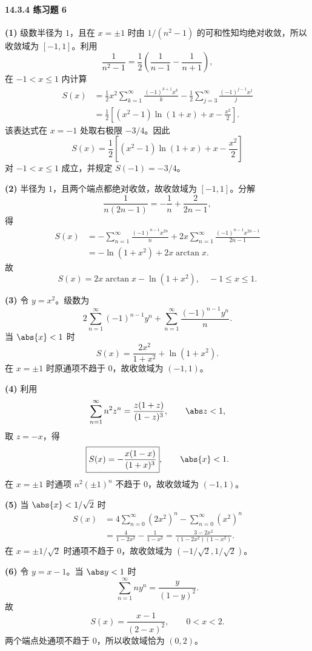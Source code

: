 \paragraph{14.3.4 练习题 6}
\begin{xsolution}
\textbf{(1)} 级数半径为 $1$，且在 $x=\pm1$ 时由 $1/(n^2-1)$ 的可和性知均绝对收敛，所以收敛域为 $[-1,1]$。利用
\[
  \frac1{n^2-1}=\frac12\left(\frac1{n-1}-\frac1{n+1}\right),
\]
在 $-1<x\leqslant1$ 内计算
\[
\begin{aligned}
  S(x)
  &=\frac12x^2\sum_{k=1}^{\infty}\frac{(-1)^{k+1}x^k}{k}
   -\frac12\sum_{j=3}^{\infty}\frac{(-1)^{j-1}x^j}{j}\\
  &=\frac12\left[(x^2-1)\ln(1+x)+x-\frac{x^2}{2}\right].
\end{aligned}
\]
该表达式在 $x=-1$ 处取右极限 $-3/4$。因此
\[
  \boxed{S(x)=\frac12\left[(x^2-1)\ln(1+x)+x-\frac{x^2}{2}\right]}
\]
对 $-1<x\leqslant1$ 成立，并规定 $S(-1)=-3/4$。

\textbf{(2)} 半径为 $1$，且两个端点都绝对收敛，故收敛域为 $[-1,1]$。分解
\[
  \frac1{n(2n-1)}=-\frac1n+\frac2{2n-1},
\]
得
\[
\begin{aligned}
  S(x)
  &=-\sum_{n=1}^{\infty}\frac{(-1)^{n-1}x^{2n}}n
  +2x\sum_{n=1}^{\infty}\frac{(-1)^{n-1}x^{2n-1}}{2n-1}\\
  &=-\ln(1+x^2)+2x\arctan x.
\end{aligned}
\]
故
\[
  \boxed{S(x)=2x\arctan x-\ln(1+x^2),\quad -1\leqslant x\leqslant1}.
\]

\textbf{(3)} 令 $y=x^2$。级数为
\[
  2\sum_{n=1}^{\infty}(-1)^{n-1}y^n
  +\sum_{n=1}^{\infty}\frac{(-1)^{n-1}y^n}{n}.
\]
当 $\abs{x}<1$ 时
\[
  \boxed{S(x)=\frac{2x^2}{1+x^2}+\ln(1+x^2)}.
\]
在 $x=\pm1$ 时原通项不趋于 $0$，故收敛域为 $(-1,1)$。

\textbf{(4)} 利用
\[
  \sum_{n=1}^{\infty}n^2z^n=\frac{z(1+z)}{(1-z)^3},\qquad \abs z<1,
\]
取 $z=-x$，得
\[
  \boxed{S(x)=-\frac{x(1-x)}{(1+x)^3}},\qquad \abs{x}<1.
\]
在 $x=\pm1$ 时通项 $n^2(\pm1)^n$ 不趋于 $0$，故收敛域为 $(-1,1)$。

\textbf{(5)} 当 $\abs{x}<1/\sqrt2$ 时
\[
\begin{aligned}
  S(x)
  &=4\sum_{n=0}^{\infty}(2x^2)^n-\sum_{n=0}^{\infty}(x^2)^n\\
  &=\frac4{1-2x^2}-\frac1{1-x^2}
  =\boxed{\frac{3-2x^2}{(1-2x^2)(1-x^2)}}.
\end{aligned}
\]
在 $x=\pm1/\sqrt2$ 时通项不趋于 $0$，故收敛域为 $(-1/\sqrt2,1/\sqrt2)$。

\textbf{(6)} 令 $y=x-1$。当 $\abs y<1$ 时
\[
  \sum_{n=1}^{\infty}ny^n=\frac{y}{(1-y)^2}.
\]
故
\[
  \boxed{S(x)=\frac{x-1}{(2-x)^2}},
  \qquad 0<x<2.
\]
两个端点处通项不趋于 $0$，所以收敛域恰为 $(0,2)$。
\end{xsolution}

